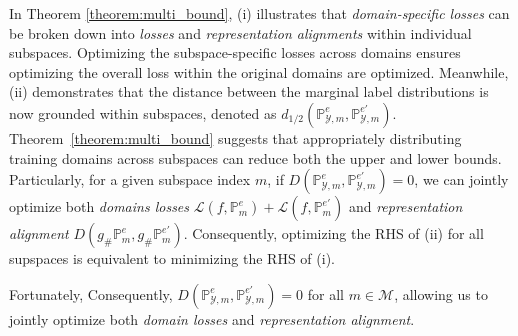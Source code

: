 In Theorem \ref{theorem:multi_bound}, (i) illustrates that \textit{domain-specific losses} can be broken down into \textit{losses} and \textit{representation alignments} within individual subspaces. Optimizing the subspace-specific losses across domains ensures optimizing the overall loss within the original domains are optimized. Meanwhile, (ii) demonstrates that the distance between the marginal label distributions is now grounded within subspaces, denoted as $d_{1/2}\left(\mathbb{P}^{e}_{\mathcal{Y},m},\mathbb{P}^{e'}_{\mathcal{Y},m}\right)$. Theorem~\ref{theorem:multi_bound} suggests that appropriately distributing training domains across subspaces can reduce both the upper and lower bounds. Particularly, for a given subspace index $m$, if $D\left(\mathbb{P}^{e}_{\mathcal{Y},m},\mathbb{P}^{e'}_{\mathcal{Y},m}\right)=0$, we can jointly optimize both \textit{domains losses} $\mathcal{L}\left (f,\mathbb{P}^{e}_m \right ) + \mathcal{L}\left (  f,\mathbb{P}^{e'}_m \right )$ and \textit{representation alignment} $D\left ( g_{\#}\mathbb{P}^{e}_m,g_{\#}\mathbb{P}^{e'}_m \right )$. Consequently, optimizing the RHS of (ii) for all supspaces is equivalent to minimizing the RHS of (i).

Fortunately, Consequently, \(D\left(\mathbb{P}^{e}_{\mathcal{Y},m}, \mathbb{P}^{e'}_{\mathcal{Y},m}\right) = 0\) for all \(m \in \mathcal{M}\), allowing us to jointly optimize both \textit{domain losses} and \textit{representation alignment}.


